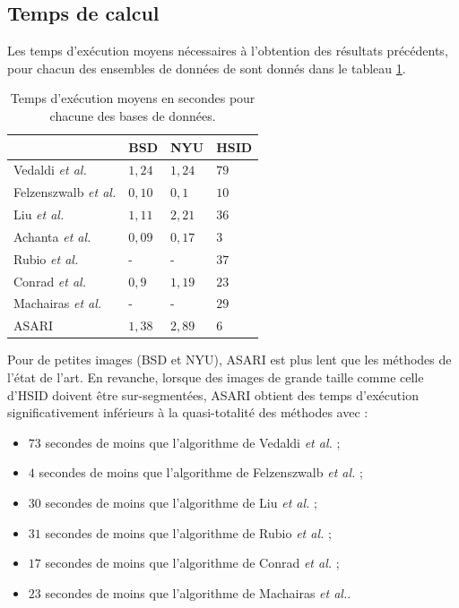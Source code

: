 \subsection{Temps de calcul}

Les temps d'exécution moyens nécessaires à l'obtention des résultats précédents, pour chacun des ensembles de données de  sont donnés dans le tableau \ref{tab:asari:time}.

\begin{table}[h]
\caption{Temps d'exécution moyens en secondes pour chacune des bases de données.}
\centering
\begin{tabular}{| l  |  l | l |  l |}
\hline
 \cellcolor{gris}{Méthodes} &   \cellcolor{gris}BSD &  \cellcolor{gris}NYU &  \cellcolor{gris}HSID\\
\hline
Vedaldi \textit{et al.} & $1,24$  & $1,24$ & $79$ \\
\hline
Felzenszwalb \textit{et al.}  &  $0,10$ & $0,1$ & $10$\\
\hline
Liu \textit{et al.} & $1,11$ & $2,21$ & $36$\\
\hline
Achanta \textit{et al.}  & $0,09$ & $0,17$ & $3$ \\
\hline
Rubio \textit{et al.} & - &- & $37$ \\
\hline
Conrad \textit{et al.}  & $0,9$ & $1,19$ & $23$ \\
\hline
Machairas \textit{et al.}  & -& - &$29$ \\
\hline
ASARI  & $1,38$ & $2,89$ & $6$ \\
\hline
 \end{tabular} 
 \label{tab:asari:time}
\end{table}


Pour de petites images (BSD et NYU), ASARI est plus lent que les méthodes de l'état de l'art. En revanche, lorsque des images de grande taille comme celle d'HSID doivent être sur-segmentées, ASARI obtient des temps d'exécution significativement inférieurs à la quasi-totalité des méthodes avec :
\begin{itemize}
\item $73$ secondes de moins que l'algorithme de Vedaldi \textit{et al.} ;
\item $4$ secondes de moins que l'algorithme de Felzenszwalb \textit{et al.} ;
\item $30$ secondes de moins que l'algorithme de Liu \textit{et al.} ;
\item $31$ secondes de moins que l'algorithme de Rubio \textit{et al.} ;
\item $17$ secondes de moins que l'algorithme de Conrad \textit{et al.} ;
\item $23$ secondes de moins que l'algorithme de Machairas \textit{et al.}.
\end{itemize}

